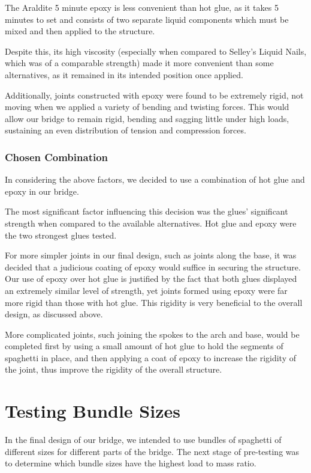 \documentclass[a4paper,11pt]{article}
\begin{document}
The Araldite 5 minute epoxy is less convenient than hot glue, as it takes 5
minutes to set and consists of two separate liquid components which must be
mixed and then applied to the structure.

Despite this, its high viscosity (especially when compared to Selley's Liquid
Nails, which was of a comparable strength) made it more convenient than some
alternatives, as it remained in its intended position once applied.

Additionally, joints constructed with epoxy were found to be extremely rigid,
not moving when we applied a variety of bending and twisting forces.
This would allow our bridge to remain rigid, bending and sagging little under
high loads, sustaining an even distribution of tension and compression forces.


\subsubsection{Chosen Combination}

In considering the above factors, we decided to use a combination of hot glue
and epoxy in our bridge.

The most significant factor influencing this decision was the glues' significant
strength when compared to the available alternatives.
Hot glue and epoxy were the two strongest glues tested.

For more simpler joints in our final design, such as joints along the base, it
was decided that a judicious coating of epoxy would suffice in securing the
structure.
Our use of epoxy over hot glue is justified by the fact that both glues
displayed an extremely similar level of strength, yet joints formed using epoxy
were far more rigid than those with hot glue. This rigidity is very beneficial
to the overall design, as discussed above.

More complicated joints, such joining the spokes to the arch and base, would
be completed first by using a small amount of hot glue to hold the segments of
spaghetti in place, and then applying a coat of epoxy to increase the rigidity
of the joint, thus improve the rigidity of the overall structure.




\section{Testing Bundle Sizes}

In the final design of our bridge, we intended to use bundles of spaghetti of
different sizes for different parts of the bridge.
The next stage of pre-testing was to determine which bundle sizes have the
highest load to mass ratio.
\end{document}
